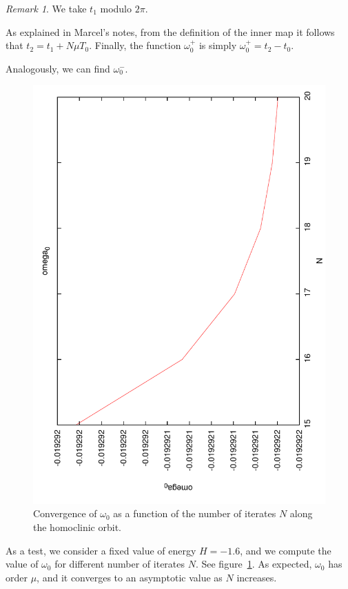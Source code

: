 \documentclass[a4paper]{amsart}
\theoremstyle{remark}
\newtheorem{rem}[thm]{Remark}
\begin{document}
\begin{rem}
We take $t_1$ modulo $2\pi$.
\end{rem}

As explained in Marcel's notes, from the definition of the inner map
it follows that $t_2 = t_1 +N\mu T_0$.
Finally, the function $\omega_0^+$ is simply $\omega_0^+ = t_2 - t_0$.

Analogously, we can find $\omega_0^-$.

\begin{figure}
\includegraphics[angle=-90,width=\textwidth]{figs/omega}
\caption{Convergence of $\omega_0$ as a function of the number of
iterates $N$ along the homoclinic orbit.}
\label{fig:omega}
\end{figure}

As a test, we consider a fixed value of energy $H=-1.6$, and we
compute the value of $\omega_0$ for different number of iterates $N$.
See figure~\ref{fig:omega}.
As expected, $\omega_0$ has order $\mu$, and it converges to an
asymptotic value as $N$ increases.
\end{document}
